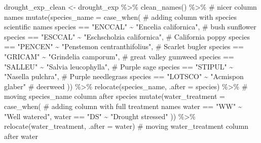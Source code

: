 \documentclass[
  letterpaper,
  DIV=11,
  numbers=noendperiod]{scrartcl}
\newenvironment{Shaded}{\begin{snugshade}}{\end{snugshade}}
\newcommand{\AttributeTok}[1]{\textcolor[rgb]{0.40,0.45,0.13}{#1}}
\newcommand{\CommentTok}[1]{\textcolor[rgb]{0.37,0.37,0.37}{#1}}
\newcommand{\FunctionTok}[1]{\textcolor[rgb]{0.28,0.35,0.67}{#1}}
\newcommand{\NormalTok}[1]{\textcolor[rgb]{0.00,0.23,0.31}{#1}}
\newcommand{\OtherTok}[1]{\textcolor[rgb]{0.00,0.23,0.31}{#1}}
\newcommand{\SpecialCharTok}[1]{\textcolor[rgb]{0.37,0.37,0.37}{#1}}
\newcommand{\StringTok}[1]{\textcolor[rgb]{0.13,0.47,0.30}{#1}}
\begin{document}
\begin{Shaded}
\begin{Highlighting}[]
\NormalTok{drought\_exp\_clean }\OtherTok{\textless{}{-}}\NormalTok{ drought\_exp }\SpecialCharTok{\%\textgreater{}\%} 
  \FunctionTok{clean\_names}\NormalTok{() }\SpecialCharTok{\%\textgreater{}\%} \CommentTok{\# nicer column names}
  \FunctionTok{mutate}\NormalTok{(}\AttributeTok{species\_name =} \FunctionTok{case\_when}\NormalTok{( }\CommentTok{\# adding column with species scientific names}
\NormalTok{    species }\SpecialCharTok{==} \StringTok{"ENCCAL"} \SpecialCharTok{\textasciitilde{}} \StringTok{"Encelia californica"}\NormalTok{, }\CommentTok{\# bush sunflower}
\NormalTok{    species }\SpecialCharTok{==} \StringTok{"ESCCAL"} \SpecialCharTok{\textasciitilde{}} \StringTok{"Eschscholzia californica"}\NormalTok{, }\CommentTok{\# California poppy}
\NormalTok{    species }\SpecialCharTok{==} \StringTok{"PENCEN"} \SpecialCharTok{\textasciitilde{}} \StringTok{"Penstemon centranthifolius"}\NormalTok{, }\CommentTok{\# Scarlet bugler}
\NormalTok{    species }\SpecialCharTok{==} \StringTok{"GRICAM"} \SpecialCharTok{\textasciitilde{}} \StringTok{"Grindelia camporum"}\NormalTok{, }\CommentTok{\# great valley gumweed}
\NormalTok{    species }\SpecialCharTok{==} \StringTok{"SALLEU"} \SpecialCharTok{\textasciitilde{}} \StringTok{"Salvia leucophylla"}\NormalTok{, }\CommentTok{\# Purple sage}
\NormalTok{    species }\SpecialCharTok{==} \StringTok{"STIPUL"} \SpecialCharTok{\textasciitilde{}} \StringTok{"Nasella pulchra"}\NormalTok{, }\CommentTok{\# Purple needlegrass}
\NormalTok{    species }\SpecialCharTok{==} \StringTok{"LOTSCO"} \SpecialCharTok{\textasciitilde{}} \StringTok{"Acmispon glaber"} \CommentTok{\# deerweed}
\NormalTok{  )) }\SpecialCharTok{\%\textgreater{}\%} 
  \FunctionTok{relocate}\NormalTok{(species\_name, }\AttributeTok{.after =}\NormalTok{ species) }\SpecialCharTok{\%\textgreater{}\%} \CommentTok{\# moving species\_name column after species}
  \FunctionTok{mutate}\NormalTok{(}\AttributeTok{water\_treatment =} \FunctionTok{case\_when}\NormalTok{( }\CommentTok{\# adding column with full treatment names}
\NormalTok{    water }\SpecialCharTok{==} \StringTok{"WW"} \SpecialCharTok{\textasciitilde{}} \StringTok{"Well watered"}\NormalTok{,}
\NormalTok{    water }\SpecialCharTok{==} \StringTok{"DS"} \SpecialCharTok{\textasciitilde{}} \StringTok{"Drought stressed"}
\NormalTok{  )) }\SpecialCharTok{\%\textgreater{}\%} 
  \FunctionTok{relocate}\NormalTok{(water\_treatment, }\AttributeTok{.after =}\NormalTok{ water) }\CommentTok{\# moving water\_treatment column after water}
\end{Highlighting}
\end{Shaded}
\end{document}
